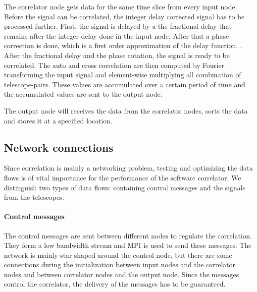 The correlator node gets data for the same time slice from every input
node. Before the signal can be correlated, the integer delay corrected
signal has to be processed further. First, the signal is delayed by a
the fractional delay that remains after the integer delay done in the
input node. After that a phase correction is done, which is a first
order approximation of the delay function. . After the fractional delay and the phase rotation, the
signal is ready to be correlated. The auto and cross correlation are
then computed by Fourier transforming the input signal and
element-wise multiplying all combination of telescope-pairs. These
values are accumulated over a certain period of time and the
accumulated values are sent to the output node.

The output node will receives the data from the correlator nodes,
sorts the data and stores it at a specified location.

\subsection{Network connections}
Since correlation is mainly a networking problem, testing and
optimizing the data flows is of vital importance for the performance
of the software correlator. We distinguish two types of data flows:
containing control messages and the signals from the telescopes. 

\paragraph{Control messages}
The control messages are sent between different nodes to regulate the
correlation. They form a low bandwidth stream and MPI is used to send
these messages. The network is mainly star shaped around the control
node, but there are some connections during the initialization between
input nodes and the correlator nodes and between correlator nodes and
the output node. Since the messages control the correlator, the
delivery of the messages has to be guaranteed. 

